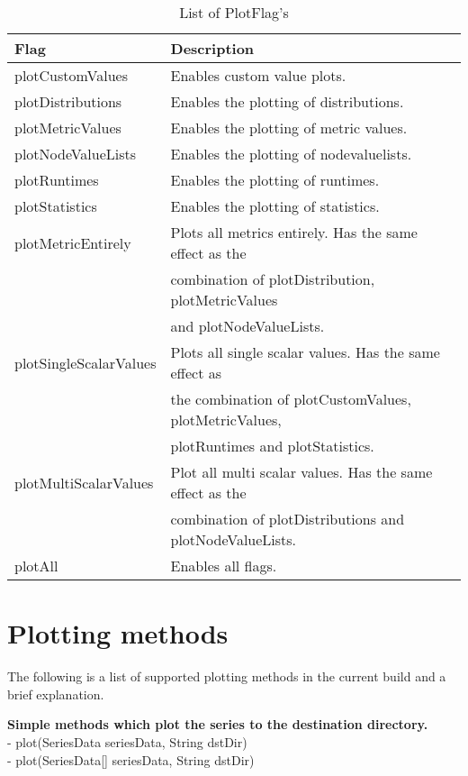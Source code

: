 \begin{table}[h]
\centering
\begin{tabular}[h]{|l|l|}\hline
	\textbf{Flag} & \textbf{Description}\\
	\hline
	plotCustomValues & Enables custom value plots.\\
	\hline
	plotDistributions & Enables the plotting of distributions.\\
	\hline
	plotMetricValues & Enables the plotting of metric values.\\
	\hline
	plotNodeValueLists & Enables the plotting of nodevaluelists.\\
	\hline
	plotRuntimes & Enables the plotting of runtimes.\\
	\hline
	plotStatistics & Enables the plotting of statistics.\\
	\hline
	plotMetricEntirely & Plots all metrics entirely. Has the same effect as the\\
	& combination of plotDistribution, plotMetricValues\\
	& and plotNodeValueLists. \\
	\hline
	plotSingleScalarValues & Plots all single scalar values. Has the same effect as\\
	& the combination of plotCustomValues, plotMetricValues,\\
	& plotRuntimes and plotStatistics.\\
	\hline
	plotMultiScalarValues & Plot all multi scalar values. Has the same effect as the\\
	& combination of plotDistributions and plotNodeValueLists.\\
	\hline
	plotAll & Enables all flags.\\
	\hline
\end{tabular}
\caption{List of PlotFlag's}
\label{tab:plot-flags}
\end{table}

\section{Plotting methods}
\label{sec:methods}
The following is a list of supported plotting methods in the current build and a brief explanation.

\textbf{Simple methods which plot the series to the destination directory.}\\
- plot(SeriesData seriesData, String dstDir)\\
- plot(SeriesData[] seriesData, String dstDir)

